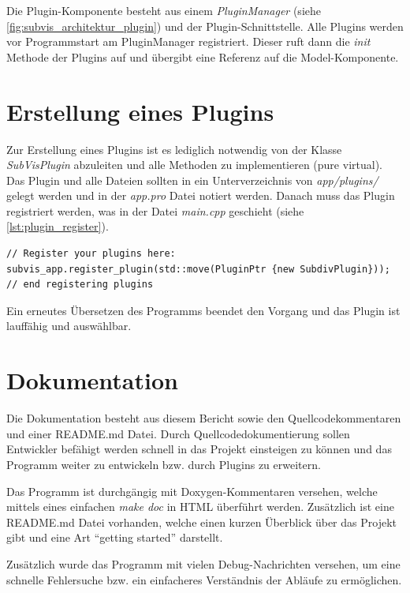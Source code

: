 Die Plugin-Komponente besteht aus einem \emph{PluginManager} (siehe \autoref{fig:subvis_architektur_plugin}) und der Plugin-Schnittstelle.
Alle Plugins werden vor Programmstart am PluginManager registriert.
Dieser ruft dann die \emph{init} Methode der Plugins auf und übergibt eine Referenz auf die Model-Komponente.


\section{Erstellung eines Plugins}

Zur Erstellung eines Plugins ist es lediglich notwendig von der Klasse \emph{SubVisPlugin} abzuleiten und alle Methoden zu implementieren (pure virtual).
Das Plugin und alle Dateien sollten in ein Unterverzeichnis von \emph{app/plugins/} gelegt werden und in der \emph{app.pro} Datei notiert werden.
Danach muss das Plugin registriert werden, was in der Datei \emph{main.cpp} geschieht (siehe \autoref{lst:plugin_register}).

\begin{lstlisting}[style=myCppStyle, caption={Registrierung eines Plugins}, label=lst:plugin_register]
// Register your plugins here:
subvis_app.register_plugin(std::move(PluginPtr {new SubdivPlugin}));
// end registering plugins
\end{lstlisting}

Ein erneutes Übersetzen des Programms beendet den Vorgang und das Plugin ist lauffähig und auswählbar.

\section{Dokumentation}

Die Dokumentation besteht aus diesem Bericht sowie den Quellcodekommentaren und einer README.md Datei.
Durch Quellcodedokumentierung sollen Entwickler befähigt werden schnell in das Projekt einsteigen zu können und das Programm weiter zu entwickeln bzw. durch Plugins zu erweitern.

Das Programm ist durchgängig mit Doxygen-Kommentaren versehen, welche mittels eines einfachen \emph{make doc} in HTML überführt werden.
Zusätzlich ist eine README.md Datei vorhanden, welche einen kurzen Überblick über das Projekt gibt und eine Art \enquote{getting started} darstellt.

Zusätzlich wurde das Programm mit vielen Debug-Nachrichten versehen, um eine schnelle Fehlersuche bzw. ein einfacheres Verständnis der Abläufe zu ermöglichen.

